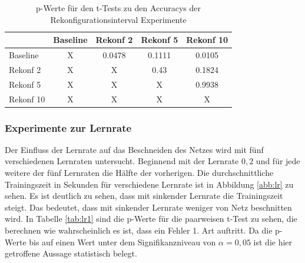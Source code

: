 \begin{table}[]
\caption{p-Werte für den t-Tests zu den Accuracys der Rekonfigurationsinterval Experimente}
\begin{tabular}{l|c|c|c|c|}
\cline{2-5}
                                & \multicolumn{1}{l|}{Baseline} & \multicolumn{1}{l|}{Rekonf 2}  & \multicolumn{1}{l|}{Rekonf 5}  & \multicolumn{1}{l|}{Rekonf 10} \\ \hline
\multicolumn{1}{|l|}{Baseline}  & X                             & \cellcolor[HTML]{FFFFFF}0.0478 & \cellcolor[HTML]{FE0000}0.1111 & \cellcolor[HTML]{FFFFFF}0.0105 \\ \hline
\multicolumn{1}{|l|}{Rekonf 2}  & X                             & X                              & \cellcolor[HTML]{FE0000}0.43   & \cellcolor[HTML]{FE0000}0.1824 \\ \hline
\multicolumn{1}{|l|}{Rekonf 5}  & X                             & X                              & X                              & \cellcolor[HTML]{FE0000}0.9938 \\ \hline
\multicolumn{1}{|l|}{Rekonf 10} & X                             & X                              & X                              & X                              \\ \hline
\end{tabular}
\label{tab:reconf2}
\end{table}
 
  
\subsubsection{Experimente zur Lernrate}
Der Einfluss der Lernrate auf das Beschneiden des Netzes wird mit fünf verschiedenen Lernraten untersucht. Beginnend mit der Lernrate $0,2$ und für jede weitere der fünf Lernraten die Hälfte der vorherigen.
Die durchschnittliche Trainingszeit in Sekunden für verschiedene Lernrate ist in Abbildung \ref{abb:lr} zu sehen. Es ist deutlich zu sehen, dass mit sinkender Lernrate die Trainingszeit steigt. Das bedeutet, dass mit sinkender Lernrate weniger von Netz beschnitten wird. In Tabelle \ref{tab:lr1} sind die p-Werte für die paarweisen t-Test zu sehen, die berechnen wie wahrscheinlich es ist, dass ein Fehler 1. Art auftritt. Da die p-Werte bis auf einen Wert unter dem Signifikanzniveau von $\alpha = 0,05$ ist die hier getroffene Aussage statistisch belegt.


